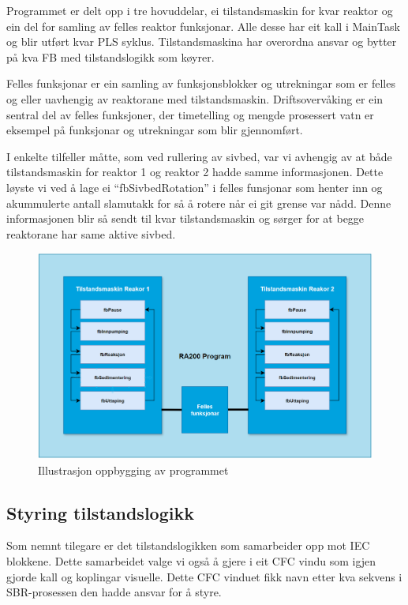 Programmet er delt opp i tre hovuddelar, ei tilstandsmaskin for kvar reaktor og ein del for samling av felles reaktor funksjonar.
Alle desse har eit kall i MainTask og blir utført kvar PLS syklus. Tilstandsmaskina har overordna ansvar og bytter på kva 
\gls{FB} med tilstandslogikk som køyrer.

Felles funksjonar er ein samling av funksjonsblokker og utrekningar som er felles og eller uavhengig av reaktorane med tilstandsmaskin.
Driftsovervåking er ein sentral del av felles funksjoner, der timetelling og mengde prosessert vatn er eksempel på funksjonar og utrekningar
som blir gjennomført.

I enkelte tilfeller måtte, som ved rullering av sivbed, var vi avhengig av at både tilstandsmaskin for reaktor 1 og reaktor 2 hadde samme informasjonen.
Dette løyste vi ved å lage ei ``fbSivbedRotation'' i felles funsjonar som henter inn og akummulerte antall slamutakk for så å rotere når ei git grense var nådd.
Denne informasjonen blir så sendt til kvar tilstandsmaskin og sørger for at begge reaktorane har same aktive sivbed.


\begin{figure}[htbp]
    \centering
    \includegraphics[width=1\textwidth]{Figurar/Oppbygging_Program.png}
    \caption{Illustrasjon oppbygging av programmet}\label{fig:OppbyggingProgram}
\end{figure}


\newpage

\subsection{Styring tilstandslogikk}

Som nemnt tilegare er det tilstandslogikken som samarbeider opp mot IEC blokkene. Dette samarbeidet valge vi også å gjere i eit
CFC vindu som igjen gjorde kall og koplingar visuelle. Dette CFC vinduet fikk navn etter kva sekvens i SBR-prosessen
den hadde ansvar for å styre. 

